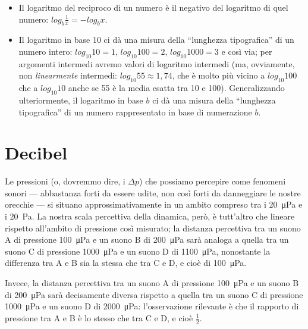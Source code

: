 \begin{itemize}
\item Il logaritmo del reciproco di un numero è il negativo del logaritmo di quel numero: $log _b \frac{1}{x} = -log _b x$.

\item Il logaritmo in base 10 ci dà una misura della ``lunghezza tipografica'' di un numero intero: $log_{10}10 = 1$, $log_{10}100 = 2$, $log_{10}1000 = 3$ e così via; per argomenti intermedi avremo valori di logaritmo intermedi (ma, ovviamente, non \emph{linearmente} intermedi: $log_{10}55 \approx 1,74$, che è molto più vicino a $log_{10}100$ che a $log_{10}10$ anche se 55 è la media esatta tra 10 e 100). Generalizzando ulteriormente, il logaritmo in base $b$ ci dà una misura della ``lunghezza tipografica'' di un numero rappresentato in base di numerazione $b$.

\end{itemize}



\section{Decibel}

Le pressioni (o, dovremmo dire, i $\Delta p$) che possiamo percepire come fenomeni sonori --- abbastanza forti da essere udite, non così forti da danneggiare le nostre orecchie --- si situano approssimativamente in un ambito compreso tra i \qty{20}{\micro\pascal} e i \qty{20}{\Pa}. La nostra scala percettiva della dinamica, però, è tutt'altro che lineare rispetto all'ambito di pressione così misurato; la distanza percettiva tra un suono A di pressione \qty{100}{\micro\pascal} e un suono B di \qty{200}{\micro\pascal} sarà analoga a quella tra un suono C di pressione \qty{1000}{\micro\pascal} e un suono D di \qty{1100}{\micro\pascal}, nonostante la differenza tra A e B sia la stessa che tra C e D, e cioè di \qty{100}{\micro\pascal}.

Invece, la distanza percettiva tra un suono A di pressione \qty{100}{\micro\pascal} e un suono B di \qty{200}{\micro\pascal} sarà decisamente diversa rispetto a quella tra un suono C di pressione \qty{1000}{\micro\pascal} e un suono D di \qty{2000}{\micro\pascal}: l'osservazione rilevante è che il rapporto di pressione tra A e B è lo stesso che tra C e D, e cioè $\frac{1}{2}$. 


